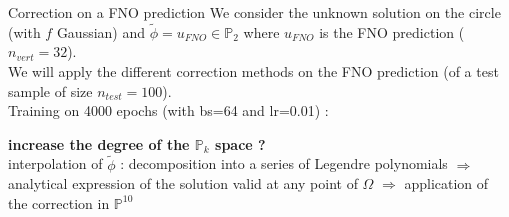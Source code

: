 \documentclass[compress,10pt,xcolor={table,dvipsnames},t]{beamer}
\begin{document}
	\begin{frame}[allowframebreaks]{Correction on a FNO prediction}
		We consider the unknown solution on the circle (with $f$ Gaussian) and
		$\tilde{\phi}=u_{FNO}\in\mathbb{P}_{2}$ where $u_{FNO}$ is the FNO prediction ($n_{vert}=32$). \\
		We will apply the different correction methods on the FNO prediction (of a test sample of size $n_{test}=100$). \\
		Training on 4000 epochs (with bs=64 and lr=0.01) :
		\begin{minipage}{0.52\linewidth}
			\centering
		\end{minipage}
		\begin{minipage}{0.46\linewidth}
			\centering
		\end{minipage}	
		
		\newpage
		
		\begin{minipage}{0.38\linewidth}
			\centering
		\end{minipage} \;
		\begin{minipage}{0.58\linewidth}
			\centering
		\end{minipage}
	
		\textbf{increase the degree of the $\mathbb{P}_k$ space ?} \\
		interpolation of $\tilde{\phi}$ : decomposition into a series of Legendre polynomials $\Rightarrow$ analytical expression of the solution valid at any point of $\Omega$ $\Rightarrow$ application of the correction in $\mathbb{P}^10$
	\end{frame}
\end{document}
